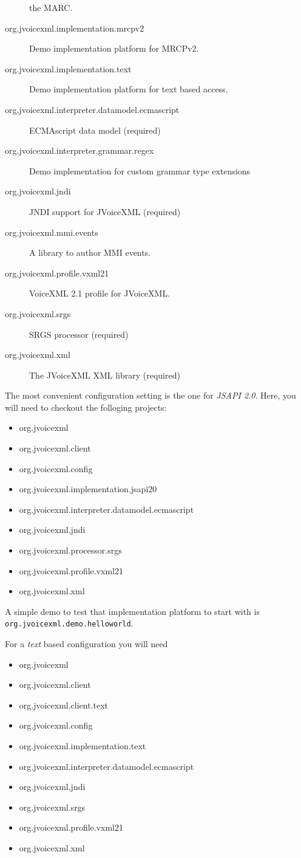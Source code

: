 \documentclass[11pt,a4paper]{article}
\begin{document}
\begin{description}
the MARC.
\item[org.jvoicexml.implementation.mrcpv2] Demo implementation platform for
MRCPv2.
\item[org.jvoicexml.implementation.text] Demo implementation platform for
text based access.
\item[org.jvoicexml.interpreter.datamodel.ecmascript] ECMAscript data model
(required)
\item[org.jvoicexml.interpreter.grammar.regex] Demo implementation for custom
grammar type extensions
\item[org.jvoicexml.jndi] JNDI support for JVoiceXML (required)
\item[org.jvoicexml.mmi.events] A library to author MMI events.
\item[org.jvoicexml.profile.vxml21] VoiceXML 2.1 profile for JVoiceXML.
\item[org.jvoicexml.srgs] SRGS processor (required)
\item[org.jvoicexml.xml] The JVoiceXML XML library (required)
\end{description}

The most convenient configuration setting is the one for \emph{JSAPI 2.0}. Here,
you will need to checkout the folloging projects:
\begin{itemize}
  \item org.jvoicexml
  \item org.jvoicexml.client
  \item org.jvoicexml.config
  \item org.jvoicexml.implementation.jsapi20
  \item org.jvoicexml.interpreter.datamodel.ecmascript
  \item org.jvoicexml.jndi
  \item org.jvoicexml.processor.srgs
  \item org.jvoicexml.profile.vxml21
  \item org.jvoicexml.xml
\end{itemize}

A simple demo to test that implementation platform to start with is
\lstinline{org.jvoicexml.demo.helloworld}.


For a \emph{text} based configuration
you will need
\begin{itemize}
  \item org.jvoicexml
  \item org.jvoicexml.client
  \item org.jvoicexml.client.text
  \item org.jvoicexml.config
  \item org.jvoicexml.implementation.text
  \item org.jvoicexml.interpreter.datamodel.ecmascript
  \item org.jvoicexml.jndi
  \item org.jvoicexml.srgs
  \item org.jvoicexml.profile.vxml21
  \item org.jvoicexml.xml
\end{itemize}
\end{document}
